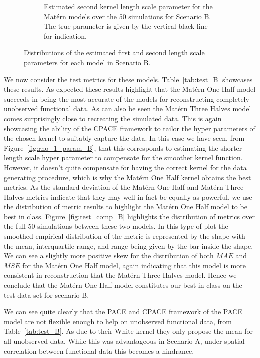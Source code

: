 \begin{figure}
\begin{subfigure}[b]{0.45\textwidth}
		\caption{Estimated second kernel length scale parameter for the Mat\'ern models over the 50 simulations for Scenario B. The true parameter is given by the vertical black line for indication.}
		\label{fig:rho_2_param_B}
	\end{subfigure}
	\caption[Distributions of the estimated first and second length scale parameters for each model in Scenario B.]{Distributions of the estimated first and second length scale parameters for each model in Scenario B.}
	\label{fig:rho_param_B}
\end{figure}

We now consider the test metrics for these models.
Table~\ref{tab:test_B} showcases these results.
As expected these results highlight that the Mat\'ern One Half model succeeds in being the most accurate of the models for reconstructing completely unobserved functional data.
As can also be seen the Mat\'ern Three Halves model comes surprisingly close to recreating the simulated data.
This is again showcasing the ability of the CPACE framework to tailor the hyper parameters of the chosen kernel to suitably capture the data.
In this case we have seen, from Figure~\ref{fig:rho_1_param_B}, that this corresponds to estimating the shorter length scale hyper parameter to compensate for the smoother kernel function.
However, it doesn't quite compensate for having the correct kernel for the data generating procedure, which is why the Mat\'ern One Half kernel obtains the best metrics.
As the standard deviation of the Mat\'ern One Half and Mat\'ern Three Halves metrics indicate that they may well in fact be equally as powerful, we use the distribution of metric results to highlight the Mat\'ern One Half model to be best in class.
Figure~\ref{fig:test_comp_B} highlights the distribution of metrics over the full 50 simulations between these two models.
In this type of plot the smoothed empirical distribution of the metric is represented by the shape with the mean, interquartile range, and range being given by the bar inside the shape. 
We can see a slightly more positive skew for the distribution of both $MAE$ and $MSE$ for the Mat\'ern One Half model, again indicating that this model is more consistent in reconstruction that the Mat\'ern Three Halves model.
Hence we conclude that the Mat\'ern One Half model constitutes our best in class on the test data set for scenario B. 

We can see quite clearly that the PACE and CPACE framework of the PACE model are not flexible enough to help on unobserved functional data, from Table~\ref{tab:test_B}.
As due to their White kernel they only propose the mean for all unobserved data.
While this was advantageous in Scenario A, under spatial correlation between functional data this becomes a hindrance. 

